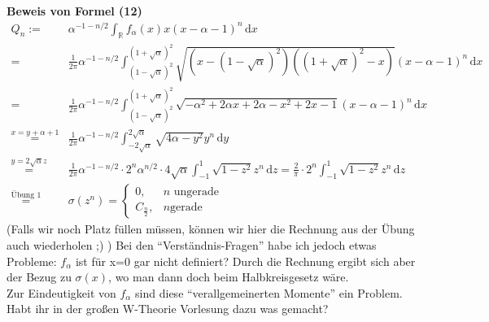 \documentclass[a4paper, 11pt]{scrreprt}
\newcommand{\RR}{\mathbb{R}}
\begin{document}
\begin{itemize}

\end{itemize}
\textbf{Beweis von Formel (12)}\\
\begin{align*}
	Q_n :=& \alpha^{-1-n/2}\int_{\RR} f_{\alpha}(x)x(x-\alpha -1)^n\,\mathrm{d}x \\
	 =& \frac{1}{2\pi}\alpha^{-1-n/2} \int_{(1-\sqrt{\alpha})^2}^{(1+\sqrt{\alpha})^2} \sqrt{(x-(1-\sqrt{\alpha})^2)((1+\sqrt{\alpha})^2-x)} (x-\alpha -1)^n \,\mathrm{d}x\\
	=& \frac{1}{2\pi}\alpha^{-1-n/2} \int_{(1-\sqrt{\alpha})^2}^{(1+\sqrt{\alpha})^2} \sqrt{-\alpha^2+2\alpha x+2\alpha -x^2+2x-1}(x-\alpha-1)^n \,\mathrm{d}x\\
	\overset{x=y+\alpha+1}{=}& \frac{1}{2\pi}\alpha^{-1-n/2} \int_{-2\sqrt{\alpha}}^{2\sqrt{\alpha}} \sqrt{4\alpha -y^2} y^n \,\mathrm{d}y\\
	\overset{y=2\sqrt{\alpha}z}{=}& \frac{1}{2\pi}\alpha^{-1-n/2} \cdot 2^n \alpha^{n/2}\cdot4\sqrt{\alpha}\int_{-1}^{1} \sqrt{1-z^2}z^n \,\mathrm{d}z = \frac{2}{\pi} \cdot 2^n\int_{-1}^{1} \sqrt{1-z^2}z^n\,\mathrm{d}z \\
	\overset{\text{Übung 1}}{=}& \sigma(z^n) = \begin{cases} 0, &n\text{ ungerade}\\
	C_{\frac n 2}, &n\text{gerade} \end{cases}
\end{align*}
(Falls wir noch Platz füllen müssen, können wir hier die Rechnung aus der Übung auch wiederholen ;) )
Bei den "`Verständnis-Fragen"' habe ich jedoch etwas Probleme: \(f_{\alpha}\) ist für x=0 gar nicht definiert? Durch die Rechnung ergibt sich aber der Bezug zu \(\sigma(x)\), wo man dann doch beim Halbkreisgesetz wäre.\\
Zur Eindeutigkeit von \(f_{\alpha}\) sind diese "`verallgemeinerten Momente"' ein Problem. Habt ihr in der großen W-Theorie Vorlesung dazu was gemacht?\\
\end{document}
